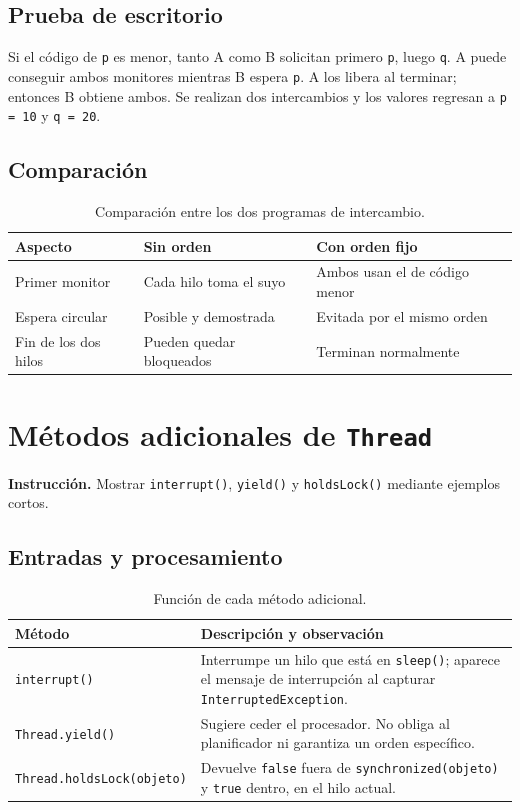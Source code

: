 \documentclass[12pt,oneside]{book}
\begin{document}
\section{Prueba de escritorio}
Si el código de \texttt{p} es menor, tanto A como B solicitan primero \texttt{p}, luego \texttt{q}. A puede conseguir ambos monitores mientras B espera \texttt{p}. A los libera al terminar; entonces B obtiene ambos. Se realizan dos intercambios y los valores regresan a \texttt{p = 10} y \texttt{q = 20}.

\section{Comparación}
\begin{table}[H]\centering
\caption{Comparación entre los dos programas de intercambio.}
\begin{tabularx}{\textwidth}{P{4.1cm} L L}
\toprule
\textbf{Aspecto} & \textbf{Sin orden} & \textbf{Con orden fijo}\\\midrule
Primer monitor & Cada hilo toma el suyo & Ambos usan el de código menor\\
Espera circular & Posible y demostrada & Evitada por el mismo orden\\
Fin de los dos hilos & Pueden quedar bloqueados & Terminan normalmente\\\bottomrule
\end{tabularx}
\end{table}


\chapter{Métodos adicionales de \texttt{Thread}}
\textbf{Instrucción.} Mostrar \texttt{interrupt()}, \texttt{yield()} y \texttt{holdsLock()} mediante ejemplos cortos.

\section{Entradas y procesamiento}
\begin{table}[H]\centering
\caption{Función de cada método adicional.}
\begin{tabularx}{\textwidth}{P{3.4cm} L}
\toprule
\textbf{Método} & \textbf{Descripción y observación}\\\midrule
\texttt{interrupt()} & Interrumpe un hilo que está en \texttt{sleep()}; aparece el mensaje de interrupción al capturar \texttt{InterruptedException}.\\
\texttt{Thread.yield()} & Sugiere ceder el procesador. No obliga al planificador ni garantiza un orden específico.\\
\texttt{Thread.\allowbreak holdsLock(\allowbreak objeto)} & Devuelve \texttt{false} fuera de \texttt{synchronized(objeto)} y \texttt{true} dentro, en el hilo actual.\\\bottomrule
\end{tabularx}
\end{table}
\end{document}
